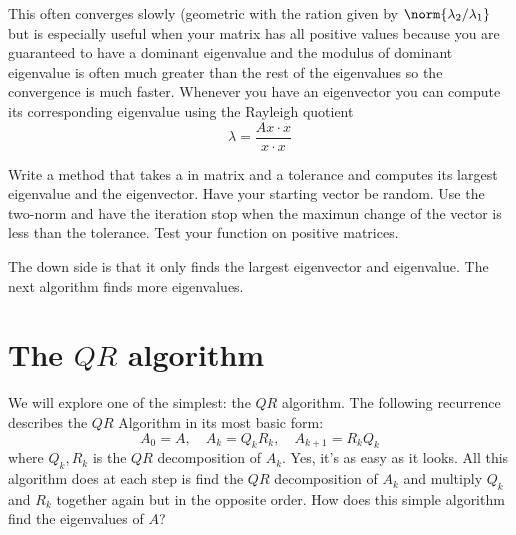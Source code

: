 This often converges slowly (geometric with the ration given by $\norm{\lambda_2/\lambda_1}$ but is especially useful when your matrix has all positive values because you are guaranteed to have a dominant eigenvalue and the modulus of dominant eigenvalue is often much greater than the rest of the eigenvalues so the convergence is much faster.
Whenever you have an eigenvector you can compute its corresponding eigenvalue using the Rayleigh quotient
\[
\lambda = \frac{Ax\cdot x}{x\cdot x}
\]
\begin{problem}
Write a method that takes a in matrix and a tolerance and computes its largest eigenvalue and the eigenvector. Have your starting vector be random. Use the two-norm and have the iteration stop when the maximun change of the vector is less than the tolerance. Test your function on positive matrices.
\end{problem}

The down side is that it only finds the largest eigenvector and eigenvalue. The next algorithm finds more eigenvalues.

\section*{The $QR$ algorithm}


We will explore one of the simplest: the $QR$ algorithm.
The following recurrence describes the $QR$ Algorithm in its most basic form:
\begin{equation*}
A_0 = A, \quad A_k = Q_k R_k, \quad A_{k+1} = R_k Q_k
\end{equation*}
where $Q_k, R_k$ is the $QR$ decomposition of $A_k$.
Yes, it's as easy as it looks.
All this algorithm does at each step is find the $QR$ decomposition of $A_k$ and multiply $Q_k$ and $R_k$ together again but in the opposite order.
How does this simple algorithm find the eigenvalues of $A$?

